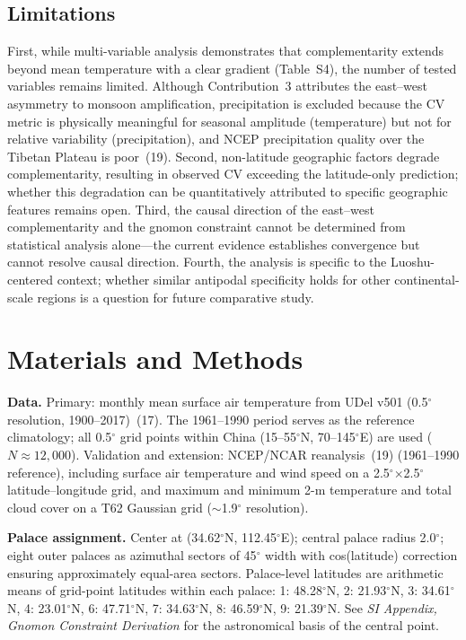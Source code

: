 \documentclass[9pt,twocolumn]{article}
\begin{document}
\subsection*{Limitations}

First, while multi-variable analysis demonstrates that complementarity extends beyond mean temperature with a clear gradient (Table~S4), the number of tested variables remains limited. Although Contribution~3 attributes the east--west asymmetry to monsoon amplification, precipitation is excluded because the CV metric is physically meaningful for seasonal amplitude (temperature) but not for relative variability (precipitation), and NCEP precipitation quality over the Tibetan Plateau is poor~(19). Second, non-latitude geographic factors degrade complementarity, resulting in observed CV exceeding the latitude-only prediction; whether this degradation can be quantitatively attributed to specific geographic features remains open. Third, the causal direction of the east--west complementarity and the gnomon constraint cannot be determined from statistical analysis alone---the current evidence establishes convergence but cannot resolve causal direction. Fourth, the analysis is specific to the Luoshu-centered context; whether similar antipodal specificity holds for other continental-scale regions is a question for future comparative study.

\section*{Materials and Methods}

\textbf{Data.} Primary: monthly mean surface air temperature from UDel v501 (0.5$^\circ$ resolution, 1900--2017)~(17). The 1961--1990 period serves as the reference climatology; all 0.5$^\circ$ grid points within China (15--55$^\circ$N, 70--145$^\circ$E) are used ($N \approx 12{,}000$). Validation and extension: NCEP/NCAR reanalysis~(19) (1961--1990 reference), including surface air temperature and wind speed on a 2.5$^\circ$$\times$2.5$^\circ$ latitude--longitude grid, and maximum and minimum 2-m temperature and total cloud cover on a T62 Gaussian grid ($\sim$1.9$^\circ$ resolution).

\textbf{Palace assignment.} Center at (34.62$^\circ$N, 112.45$^\circ$E); central palace radius 2.0$^\circ$; eight outer palaces as azimuthal sectors of 45$^\circ$ width with cos(latitude) correction ensuring approximately equal-area sectors. Palace-level latitudes are arithmetic means of grid-point latitudes within each palace: 1: 48.28$^\circ$N, 2: 21.93$^\circ$N, 3: 34.61$^\circ$N, 4: 23.01$^\circ$N, 6: 47.71$^\circ$N, 7: 34.63$^\circ$N, 8: 46.59$^\circ$N, 9: 21.39$^\circ$N. See \textit{SI Appendix, Gnomon Constraint Derivation} for the astronomical basis of the central point.
\end{document}

